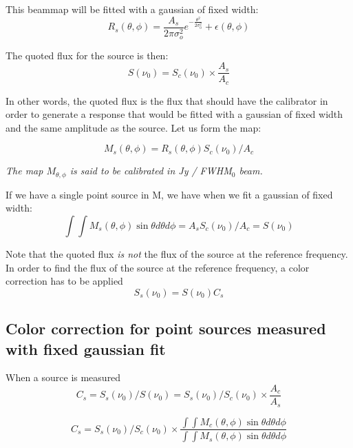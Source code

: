 This beammap will be fitted with a gaussian of fixed width:
\begin{equation} 
R_{s}(\theta, \phi)  = \frac{A_{s}}{2 \pi \sigma_{o}^{2}}
e^{-\frac{\theta^{2}}{2\sigma_{0}^{2}}}  + \epsilon(\theta, \phi)
\end{equation}

The quoted flux for the source is then:
\begin{equation}
S(\nu_{0}) =  S_{c} (\nu_{0})  \times \frac{A_{s}}{A_{c}}
\end{equation}

In other words, the quoted flux is the flux that should have the
calibrator in order to generate a response that would be fitted with a
gaussian of fixed width and the same amplitude as the source.
Let us form the map:

\begin{equation}
M_{s}(\theta, \phi) = R_{s}(\theta, \phi)   S_{c} (\nu_{0}) / A_{c}
\end{equation}

 {\em The map $M_{\theta, \phi}$ is said to be calibrated in Jy / FWHM$_{0}$ beam.}

If we have a single point source in M, we have when we fit a gaussian
of fixed width:
\begin{equation}
\int \int M_{s}(\theta, \phi) \sin \theta d\theta d\phi = A_{s}  S_{c} (\nu_{0}) /
A_{c} = S(\nu_{0})
\end{equation}


Note that the quoted flux {\em is not} the flux of the source at the
reference frequency. In order to find the flux of the source at the
reference frequency, a color correction has to be applied
\begin{equation}
S_{s}(\nu_{0}) = S(\nu_{0})  C_{s}
\end{equation}

\subsection{Color correction for point sources measured with fixed
  gaussian fit}


When a source is measured 
\begin{equation} 
C_{s} = S_{s} (\nu_{0}) / S(\nu_{0}) = S_{s}(\nu_0) / S_{c} (\nu_{0})  \times \frac{A_{c}}{A_{s}}
\end{equation}


\begin{equation} 
C_{s} = S_{s}(\nu_{0}) / S_{c} (\nu_{0})  \times \frac{\int \int
M_{c}(\theta, \phi) \sin \theta d\theta d\phi }{\int \int
M_{s}(\theta, \phi) \sin \theta d\theta d\phi }
\end{equation}

